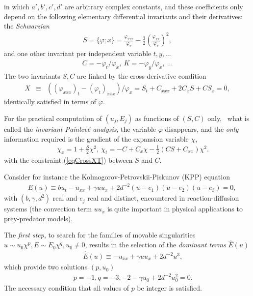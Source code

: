 \documentclass[10pt]{article}
\begin{document}
in which $a',b',c',d'$ are arbitrary complex constants,
and these coefficients only depend on the following elementary differential
invariants and their derivatives:
the \textit{Schwarzian}
\begin{eqnarray}
S=\lbrace \varphi;x \rbrace
=\frac{\varphi_{xxx}}{\varphi_x}
 - \frac{3}{2} \left(\frac{\varphi_{xx}} {\varphi_x} \right)^2,
\label{eqS}
\end{eqnarray}
and one other invariant per independent variable $t,y,\dots$
\begin{eqnarray}
C=- \varphi_t / \varphi_x,\
K=- \varphi_y / \varphi_x,\ \dots
\label{eqC}
\end{eqnarray}
The two invariants $S,C$ are linked by the cross-derivative condition
\begin{eqnarray}
X & \equiv &
((\varphi_{xxx})_t - (\varphi_t)_{xxx})/ \varphi_x
= S_t + C_{xxx} + 2 C_x S + C S_x = 0,
\label{eqCrossXT}
\end{eqnarray}
identically satisfied in terms of $\varphi$.

For the practical computation of $(u_j,E_j)$ as functions of $(S,C)$ only,
\ie\ what is called the
\textit{invariant Painlev\'e analysis},
the variable $\varphi$ disappears,
and the \textit{only} information required is the gradient
of the expansion variable $\chi$,
\begin{eqnarray}
& &
\chi_x= 1 + \frac{S}{2} \chi^2,\
\chi_t= - C + C_x \chi  - \frac{1}{2} (C S + C_{xx}) \chi^2.
\label{eqChiGradient}
\end{eqnarray}
with the constraint (\ref{eqCrossXT}) between $S$ and $C$.

Consider for instance the
Kolmogorov-Petrovskii-Piskunov (KPP) equation
\cite{KPP,NewellWhitehead}
\index{KPP equation}
\begin{eqnarray}
& & E(u) \equiv
b u_t - u_{xx} + \gamma u u_x + 2 d^{-2} (u-e_1)(u-e_2)(u-e_3)=0,\
\label{eqKPP}
\end{eqnarray}
with $(b,\gamma,d^2)$ real and $e_j$ real and distinct,
encountered in reaction-diffusion systems
(the convection term $u u_x$ \cite{Satsuma1987}
is quite important in physical applications to prey-predator models).

The \textit{first step}, to search for the families of movable singularities
$u \sim u_0 \chi^p, E \sim E_0 \chi^q, u_0 \not=0$,
results in the selection of the \textit{dominant terms} $\hat E(u)$
\begin{eqnarray}
& &
\hat E(u) \equiv - u_{xx} + \gamma u u_x + 2 d^{-2} u^3,
\end{eqnarray}
which provide two solutions $(p,u_0)$
\begin{eqnarray}
& &
p=-1, q=-3, -2 - \gamma u_0 + 2 d^{-2} u_0^2=0.
\label{eqKPPFamilies}
\end{eqnarray}
The necessary condition that all values of $p$ be integer
is satisfied.
\end{document}
